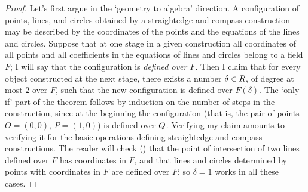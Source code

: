 \begin{proof}
  Let's first argue in the `geometry to algebra' direction. A
  configuration of points, lines, and circles obtained by a
  straightedge-and-compass construction may be described by the
  coordinates of the points and the equations of the lines and
  circles. Suppose that at one stage in a given construction all
  coordinates of all points and all coefficients in the equations of
  lines and circles belong to a field $F$; I will say that the
  configuration is \emph{defined over $F$}. Then I claim that for
  every object constructed at the next stage, there exists a number
  $\delta \in R$, of degree at most $2$ over $F$, such that the new
  configuration is defined over $F(\delta)$. The `only if' part of the
  theorem follows by induction on the number of steps in the
  construction, since at the beginning the configuration (that is, the
  pair of points $O = (0,0)$, $P = (1,0)$) is defined over $Q$.
  Verifying my claim amounts to verifying it for the basic operations
  defining straightedge-and-compass constructions. The reader will
  check
  () that
  the point of intersection of two lines defined over $F$ has
  coordinates in $F$, and that lines and circles determined by points
  with coordinates in $F$ are defined over $F$; so $\delta = 1$ works
  in all these cases.


\end{proof}
